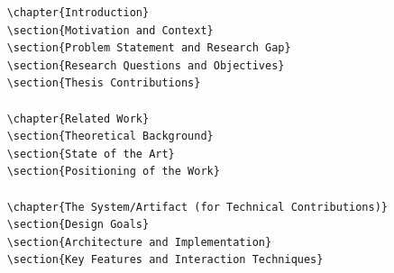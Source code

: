 \begin{verbatim}
	\chapter{Introduction}
	\section{Motivation and Context}
	\section{Problem Statement and Research Gap}
	\section{Research Questions and Objectives}
	\section{Thesis Contributions}
	
	\chapter{Related Work}
	\section{Theoretical Background}
	\section{State of the Art}
	\section{Positioning of the Work} 
	
	\chapter{The System/Artifact (for Technical Contributions)}
	\section{Design Goals}
	\section{Architecture and Implementation}
	\section{Key Features and Interaction Techniques}
	

\end{verbatim}
